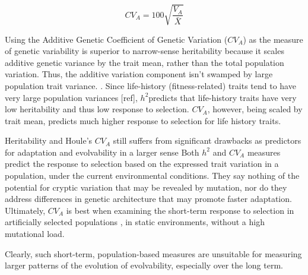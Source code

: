 \begin{equation}
CV_A = 100\sqrt{\frac{V_A}{\bar X}}
\end{equation}

Using the Additive Genetic Coefficient of Genetic Variation ($CV_A$) as the measure of genetic variability is superior to narrow-sense heritability because it scales additive genetic variance by the trait mean, rather than the total population variation. Thus, the additive variation component isn’t swamped by large population trait variance. \cite{hansen_measuring_2008}. Since life-history (fitness-related) traits tend to have very large population variances [ref], $h^2$predicts that life-history traits have very low heritability and thus low response to selection. $CV_A$, however, being scaled by trait mean, predicts much higher response to selection for life history traits. \cite{hansen_heritability_2011} \cite{houle_comparing_1992}

Heritability and Houle’s $CV_A$ still suffers from significant drawbacks as predictors for adaptation and evolvability in a larger sense \cite{hansen_heritability_2011} Both $h^2$ and $CV_A$ measures predict the response to selection based on the expressed trait variation in a population, under the current environmental conditions. They say nothing of the potential for cryptic variation that may be revealed by mutation, nor do they address differences in genetic architecture that may promote faster adaptation. Ultimately, $CV_A$ is best when examining the short-term response to selection in artificially selected populations \cite{houle_comparing_1992}, in static environments, without a high mutational load.

Clearly, such short-term, population-based measures are unsuitable for measuring larger patterns of the evolution of evolvability, especially over the long term.

